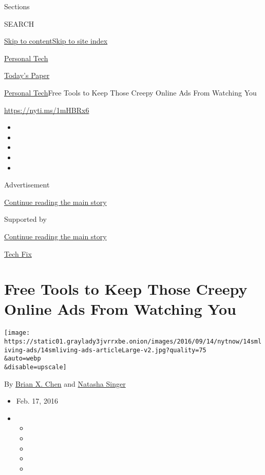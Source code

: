 Sections

SEARCH

\protect\hyperlink{site-content}{Skip to
content}\protect\hyperlink{site-index}{Skip to site index}

\href{https://www.nytimes3xbfgragh.onion/section/technology/personaltech}{Personal
Tech}

\href{https://myaccount.nytimes3xbfgragh.onion/auth/login?response_type=cookie\&client_id=vi}{}

\href{https://www.nytimes3xbfgragh.onion/section/todayspaper}{Today's
Paper}

\href{/section/technology/personaltech}{Personal Tech}\textbar{}Free
Tools to Keep Those Creepy Online Ads From Watching You

\url{https://nyti.ms/1mHBRx6}

\begin{itemize}
\item
\item
\item
\item
\item
\end{itemize}

Advertisement

\protect\hyperlink{after-top}{Continue reading the main story}

Supported by

\protect\hyperlink{after-sponsor}{Continue reading the main story}

\href{/column/tech-fix}{Tech Fix}

\hypertarget{free-tools-to-keep-those-creepy-online-ads-from-watching-you}{%
\section{Free Tools to Keep Those Creepy Online Ads From Watching
You}\label{free-tools-to-keep-those-creepy-online-ads-from-watching-you}}

\texttt{[image: https://static01.graylady3jvrrxbe.onion/images/2016/09/14/nytnow/14smliving-ads/14smliving-ads-articleLarge-v2.jpg?quality=75\\\&auto=webp\\\&disable=upscale]}

By \href{http://www.nytimes3xbfgragh.onion/by/brian-x-chen}{Brian X.
Chen} and
\href{http://www.nytimes3xbfgragh.onion/by/natasha-singer}{Natasha
Singer}

\begin{itemize}
\item
  Feb. 17, 2016
\item
  \begin{itemize}
  \item
  \item
  \item
  \item
  \item
  \end{itemize}
\end{itemize}

